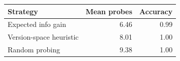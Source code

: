\begin{tabular}{lrr}
\toprule
Strategy & Mean probes & Accuracy \\
\midrule
Expected info gain & 6.46 & 0.99 \\
Version-space heuristic & 8.01 & 1.00 \\
Random probing & 9.38 & 1.00 \\
\bottomrule
\end{tabular}

